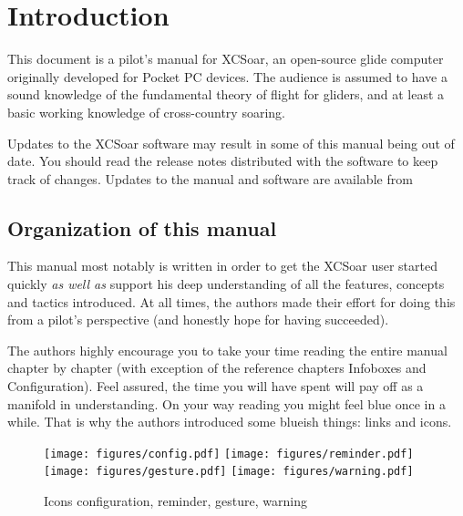 \chapter{Introduction}\label{cha:introduction}
This document is a pilot's manual for XCSoar, an open-source glide
computer originally developed for Pocket PC devices.  The audience 
is assumed to have a sound knowledge of the fundamental theory of flight for
gliders, and at least a basic working knowledge of cross-country soaring.

Updates to the XCSoar software may result in some of this manual being
out of date. You should read the release notes distributed with the
software to keep track of changes.  Updates to the manual and software
are available from 
\begin{quote}
\xcsoarwebsite{}
\end{quote}

\section{Organization of this manual}

This manual most notably is written in order to get the XCSoar user started 
quickly  \emph{as well as} support his deep understanding of all the features, 
concepts and tactics introduced. At all times, the authors made their effort 
for doing this from a pilot's perspective (and honestly hope for having 
succeeded).

The authors highly encourage you to take your time reading the entire manual 
chapter by chapter (with exception of the reference chapters Infoboxes and 
Configuration). Feel assured, the time you will have spent will pay off as a 
manifold in understanding. On your way reading you might feel blue once in a 
while. That is why the authors introduced some blueish things: links and 
icons.

\begin{figure}[h]
\centering
\texttt{[image: figures/config.pdf]}
\hspace{1.5cm}
\texttt{[image: figures/reminder.pdf]}
\hspace{1.5cm}
\texttt{[image: figures/gesture.pdf]}
\hspace{1.5cm}
\texttt{[image: figures/warning.pdf]}
\caption{Icons configuration, reminder, gesture, warning}
\end{figure}

